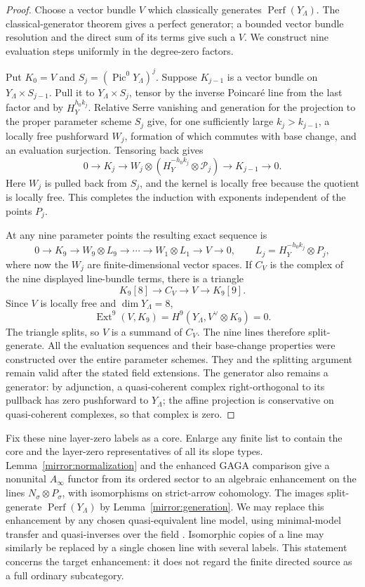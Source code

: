 \documentclass[11pt]{article}
\theoremstyle{definition}
\theoremstyle{remark}
\numberwithin{equation}{section}
\begin{document}
\begin{proof}
Choose a vector bundle $V$ which classically generates
$\operatorname{Perf}(Y_\Lambda)$.  The classical-generator theorem
\cite{bondal-vdb} gives a perfect generator; a bounded vector bundle
resolution and the direct sum of its terms give such a $V$.
We construct nine evaluation steps uniformly in the degree-zero
factors.

Put $K_0=V$ and $S_j=(\operatorname{Pic}^0Y_\Lambda)^j$.  Suppose $K_{j-1}$ is
a vector bundle on $Y_\Lambda\times S_{j-1}$.  Pull it to
$Y_\Lambda\times S_j$, tensor by the inverse Poincar\'e line from
the last factor and by $H_Y^{h_0k_j}$.  Relative Serre vanishing and
generation for the projection to the proper parameter scheme $S_j$
give, for one sufficiently large $k_j>k_{j-1}$, a locally free
pushforward $W_j$, formation of which commutes with base change,
and an evaluation surjection.  Tensoring back gives
\[
 0\longrightarrow K_j\longrightarrow
 W_j\otimes(H_Y^{-h_0k_j}\otimes\mathcal P_j)
 \longrightarrow K_{j-1}\longrightarrow0.
\]
Here $W_j$ is pulled back from $S_j$, and the kernel is locally free
because the quotient is locally free.  This completes the induction
with exponents independent of the points $P_j$.

At any nine parameter points the resulting exact sequence is
\[
 0\to K_9\to W_9\otimes L_9\to\cdots\to
 W_1\otimes L_1\to V\to0,
 \qquad L_j=H_Y^{-h_0k_j}\otimes P_j,
\]
where now the $W_j$ are finite-dimensional vector spaces.  If $C_V$
is the complex of the nine displayed line-bundle terms, there is a
triangle
\[
 K_9[8]\longrightarrow C_V\longrightarrow V
       \longrightarrow K_9[9].
\]
Since $V$ is locally free and $\dim Y_\Lambda=8$,
\[
 \operatorname{Ext}^9(V,K_9)=H^9(Y_\Lambda,V^\vee\otimes K_9)=0.
\]
The triangle splits, so $V$ is a summand of $C_V$.  The nine lines
therefore split-generate.  All the evaluation sequences and their
base-change properties were constructed over the entire parameter
schemes.  They and the splitting argument remain valid after the
stated field extensions.  The generator also remains a generator:
by adjunction, a quasi-coherent complex right-orthogonal to its
pullback has zero pushforward to $Y_\Lambda$; the affine projection
is conservative on quasi-coherent complexes, so that complex is zero.
\end{proof}

Fix these nine layer-zero labels as a core.  Enlarge any finite list
to contain the core and the layer-zero representatives of all its
slope types.  Lemma~\ref{mirror:normalization} and the enhanced GAGA
comparison give a nonunital $A_\infty$ functor from its ordered sector
to an algebraic enhancement on the lines
$N_\sigma\otimes P_\sigma$, with isomorphisms on strict-arrow
cohomology.  The images split-generate $\operatorname{Perf}(Y_\Lambda)$ by
Lemma~\ref{mirror:generation}.  We may replace this enhancement by
any chosen quasi-equivalent line model, using minimal-model transfer
and quasi-inverses over the field \cite{seidel}.  Isomorphic copies
of a line may similarly be replaced by a single chosen line with
several labels.  This statement concerns the target enhancement:
it does not regard the finite directed source as a full ordinary
subcategory.
\end{document}
